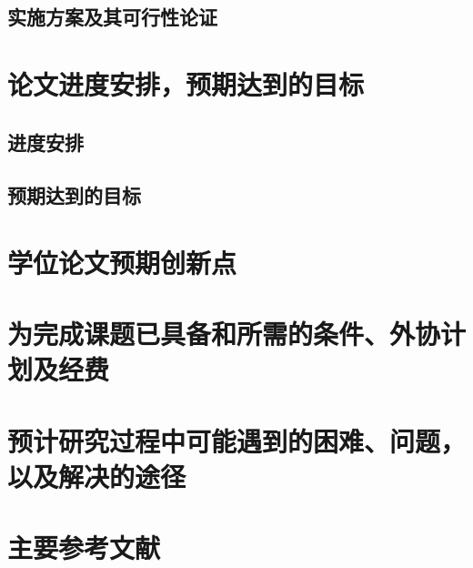 \subsection{实施方案及其可行性论证}
\section{论文进度安排，预期达到的目标}
\subsection{进度安排}
\subsection{预期达到的目标}
\section{学位论文预期创新点}
\section{为完成课题已具备和所需的条件、外协计划及经费}
\section{预计研究过程中可能遇到的困难、问题，以及解决的途径}
\section{主要参考文献}
\cite{ding2021vid}



